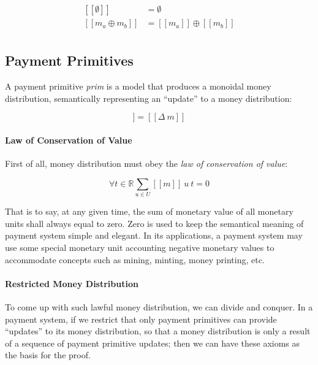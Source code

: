\begin{equation}
    \begin{split}
        [\![\emptyset]\!] &= \emptyset \\
        [\![m_a \oplus m_b]\!] &= [\![m_a]\!] \oplus [\![m_b]\!] \\
    \end{split}
\end{equation}

\subsection{Payment Primitives}

A payment primitive \textit{prim} is a model that produces a monoidal money distribution,
semantically representing an ``update'' to a money distribution:

\begin{equation}
    [\![prim]\!] = [\![\Delta\ m]\!]
\end{equation}

\paragraph{Law of Conservation of Value}

First of all, money distribution must obey the \textit{law of conservation of value}:

\begin{equation}
    \forall t \in \mathbb{R} {\displaystyle \sum_{u \in U} [\![m]\!]\ u\ t = 0}
\end{equation}

That is to say, at any given time, the sum of monetary value of all monetary units shall always
equal to zero. Zero is used to keep the semantical meaning of payment system simple and elegant. In
its applications, a payment system may use some special monetary unit accounting negative monetary
values to accommodate concepts such as mining, minting, money printing, etc.

\paragraph{Restricted Money Distribution}

To come up with such lawful money distribution, we can divide and conquer. In a payment system, if
we restrict that only payment primitives can provide ``updates'' to its money distribution, so that
a money distribution is only a result of a sequence of payment primitive updates; then we can have
these axioms as the basis for the proof.

